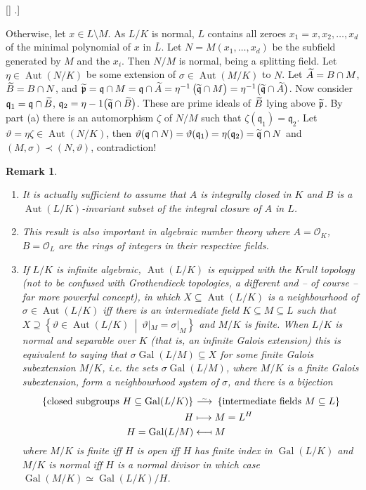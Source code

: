 \documentclass[DIV=14,parskip=full,pointednumbers]{scrartcl}
\newenvironment{alphanumerate}{\begin{enumerate}[label={$(\alph*)$},ref=\curthm]}{\end{enumerate}}
\theoremstyle{cthm}
\theoremstyle{cvarthm}
\renewenvironment{proof}[1][\proofname]
{\pushQED{\qed}\topsep0pt \partopsep0pt\trivlist\item[\hskip\labelsep\itshape #1.] }{\popQED\endtrivlist\addvspace{6pt plus 6pt}}
\theoremstyle{cdef}
\newtheorem*{rem*}{Remark}
\newcommand{\reff}[1]{%
	\edef\pretemp{\getrefnumber{#1}}%
	\StrLeft{\pretemp}{1}[\dummy]%
	\IfInteger{\dummy}{\def\temp{\pretemp}}{\def\temp{\detokenize\pretemp}}%
	\StrBehind{\temp}{\thesubsection.}[\tempcropped]%
	\IfBeginWith{\temp}{\thesubsection}{\hyperref[#1]{\tempcropped}} {\hyperref[#1]{\temp}}%
}
\newcommand{\Oo}{\mathcal{O}}
\newcommand{\pp}{\mathfrak{p}}
\newcommand{\qq}{\mathfrak{q}}
\newcommand{\Aut}{\operatorname{Aut}}
\newcommand{\Gal}{\operatorname{Gal}}
\newcommand{\ov}{\overline}
\newcommand{\snake}[1]{\widetilde{#1}\vphantom{\overrightarrow{#1}}}%
\newcommand{\isomorphism}{
	\tikz[baseline=(a.base)] \node (a) at (0,0) {$\longrightarrow$} node[above=-0.25ex] {\tiny $\sim$};}
\newcommand{\st}{\ \middle|\ }
\begin{document}
\begin{proof}[Proof of Theorem \reff{thm:actsTransitively}]
\begin{alphanumerate}
			Otherwise, let $x\in L\setminus M$. As $L/K$ is normal, $L$ contains all zeroes $x_1=x,x_2,\ldots, x_d$ of the minimal polynomial of $x$ in $\ov L$. Let $N=M(x_1,\ldots,x_d)$ be the subfield generated by $M$ and the $x_i$. Then $N/M$ is normal, being a splitting field. Let $\eta\in \Aut(N/K)$ be some extension of $\sigma\in \Aut(M/K)$ to $N$. Let $\snake A = B\cap M$, $\snake B = B\cap N$, and $\snake\pp = \qq\cap M  =\qq\cap \snake A = \eta^{-1}\left(\snake \qq\cap M\right) = \eta^{-1}\big(\snake\qq\cap \snake A\big)$. Now consider $\qq_1=\qq\cap \snake B$, $\qq_2=\eta-1\big(\snake \qq\cap\snake B\big)$. These are prime ideals of $\snake B$ lying above $\snake \pp$. By part (a) there is an automorphism $\zeta$ of $N/M$ such that $\zeta(\qq_1) = \qq_2$. Let $\vartheta = \eta\zeta\in \Aut(N/K)$, then $\vartheta(\qq\cap N) = \vartheta(\qq_1) = \eta(\qq_2) = \snake\qq\cap N$ and $(M,\sigma)\prec (N,\vartheta)$, contradiction!
		\end{alphanumerate}
	\end{proof}
	\begin{rem*}
		\begin{alphanumerate}
		\item
			It is actually sufficient to assume that $A$ is integrally closed in $K$ and $B$ is a $\Aut(L/K)$-invariant subset of the integral closure of $A$ in $L$.
		\item
			This result is also important in algebraic number theory where $A=\Oo_K$, $B=\Oo_L$ are the rings of integers in their respective fields. 
		\item If $L/K$ is infinite algebraic, $\Aut(L/K)$ is equipped with the \emph{Krull topology} (not to be confused with \emph{Grothendieck topologies}, a different and -- of course -- far more powerful concept), in which $X\subseteq \Aut(L/K)$ is a neighbourhood of $\sigma\in\Aut(L/K)$ iff there is an intermediate field $K\subseteq M\subseteq L$ such that $X\supseteq\left\{\vartheta \in \Aut(L/K)\st \vartheta|_M = \sigma|_M\right\}$ and $M/K$ is finite. When $L/K$ is normal and separable over $K$ (that is, an infinite Galois extension) this is equivalent to saying that $\sigma\Gal(L/M)\subseteq X$ for some finite Galois subextension $M/K$, i.e. the sets $\sigma\Gal(L/M)$, where $M/K$ is a finite Galois subextension, form a neighbourhood system of $\sigma$, and  there is a bijection 
		\begin{align*}
			\left\{\text{closed subgroups }H\subseteq \Gal(L/K)\right\}&\isomorphism\left\{\text{intermediate fields }M\subseteq L\right\}\\
			H&\longmapsto M= L^H\\
			H=\Gal(L/M) &\longmapsfrom M
		\end{align*}
		where $M/K$ is finite iff $H$ is open iff $H$ has finite index in $\Gal(L/K)$ and $M/K$ is normal iff $H$ is a normal divisor in which case $\Gal(M/K) \simeq \Gal(L/K)/H$.
		\end{alphanumerate}
	\end{rem*}
\end{document}
